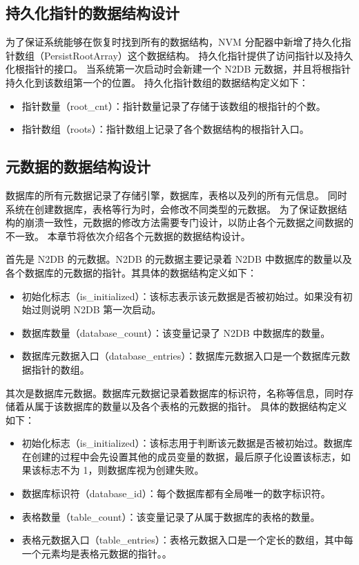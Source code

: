 \subsection{持久化指针的数据结构设计}
\label{ssec:data-structure-recovery}

为了保证系统能够在恢复时找到所有的数据结构，NVM 分配器中新增了持久化指针数组（PersistRootArray）这个数据结构。
持久化指针提供了访问指针以及持久化根指针的接口。
当系统第一次启动时会新建一个 N2DB 元数据，并且将根指针持久化到该数组第一个的位置。
持久化指针数组的数据结构定义如下：
\begin{itemize}
    \item 指针数量（root\_cnt）：指针数量记录了存储于该数组的根指针的个数。
    \item 指针数组（roots）：指针数组上记录了各个数据结构的根指针入口。
\end{itemize}



\subsection{元数据的数据结构设计}

数据库的所有元数据记录了存储引擎，数据库，表格以及列的所有元信息。
同时系统在创建数据库，表格等行为时，会修改不同类型的元数据。
为了保证数据结构的崩溃一致性，元数据的修改方法需要专门设计，以防止各个元数据之间数据的不一致。
本章节将依次介绍各个元数据的数据结构设计。

首先是 N2DB 的元数据。N2DB 的元数据主要记录着 N2DB 中数据库的数量以及各个数据库的元数据的指针。其具体的数据结构定义如下：
\begin{itemize}
    \item 初始化标志（is\_initialized）：该标志表示该元数据是否被初始过。如果没有初始过则说明 N2DB 第一次启动。
    \item 数据库数量（database\_count）：该变量记录了 N2DB 中数据库的数量。
    \item 数据库元数据入口（database\_entries）：数据库元数据入口是一个数据库元数据指针的数组。
\end{itemize}

其次是数据库元数据。数据库元数据记录着数据库的标识符，名称等信息，同时存储着从属于该数据库的数量以及各个表格的元数据的指针。
具体的数据结构定义如下：
\begin{itemize}
    \item 初始化标志（is\_initialized）：该标志用于判断该元数据是否被初始过。数据库在创建的过程中会先设置其他的成员变量的数据，最后原子化设置该标志，如果该标志不为 1，则数据库视为创建失败。
    \item 数据库标识符（database\_id）：每个数据库都有全局唯一的数字标识符。
    \item 表格数量（table\_count）：该变量记录了从属于数据库的表格的数量。
    \item 表格元数据入口（table\_entries）：表格元数据入口是一个定长的数组，其中每一个元素均是表格元数据的指针。。
\end{itemize}

